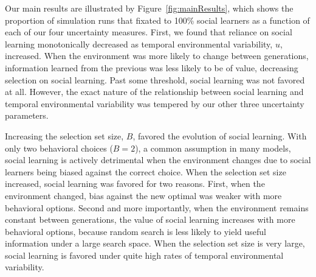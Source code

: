 \documentclass[letterpaper,11.5pt]{scrartcl}
\begin{document}


Our main results are illustrated by Figure~\ref{fig:mainResults}, which shows the proportion of simulation runs that fixated to 100\% social learners as a function of each of our four uncertainty measures.  First, we found that reliance on social learning monotonically decreased as temporal environmental variability, $u$, increased. When the environment was more likely to change between generations, information learned from the previous was less likely to be of value, decreasing selection on social learning. Past some threshold, social learning was not favored at all. However, the exact nature of the relationship between social learning and temporal environmental variability was tempered by our other three uncertainty parameters. 

Increasing the selection set size, $B$, favored the evolution of social learning. With only two behavioral choices ($B = 2$), a common assumption in many models, social learning is actively detrimental when the environment changes due to social learners being biased against the correct choice. When the selection set size increased, social learning was favored for two reasons. First, when the environment changed, bias against the new optimal was weaker with more behavioral options. Second and more importantly, when the environment remains constant between generations, the value of social learning increases with more behavioral options, because random search is less likely to yield useful information under a large search space. When the selection set size is very large, social learning is favored under quite high rates of temporal environmental variability. 
\end{document}

